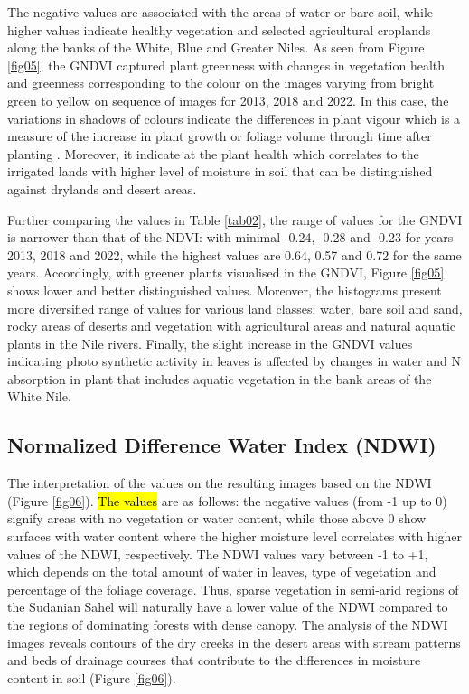 \documentclass[jimaging,article,submit,pdftex,moreauthors]{Definitions/mdpi}
\begin{document}
The negative values are associated with the areas of water or bare soil, while higher values indicate healthy vegetation and selected agricultural croplands along the banks of the White, Blue and Greater Niles. As seen from Figure \ref{fig05}, the GNDVI captured plant greenness with changes in vegetation health and greenness corresponding to the colour on the images varying from bright green to yellow on sequence of images for 2013, 2018 and 2022. In this case, the variations in shadows of colours indicate the differences in plant vigour which is a measure of the increase in plant growth or foliage volume through time after planting \cite{Dictionary}. Moreover, it indicate at the plant health which correlates to the irrigated lands with higher level of moisture in soil that can be distinguished against drylands and desert areas. 

Further comparing the values in Table \ref{tab02}, the range of values for the GNDVI is narrower than that of the NDVI: with minimal -0.24, -0.28 and -0.23 for years 2013, 2018 and 2022, while the highest values are 0.64, 0.57 and 0.72 for the same years. Accordingly, with greener plants visualised in the GNDVI, Figure \ref{fig05} shows lower and better distinguished values. Moreover, the histograms present more diversified range of values for various land classes: water, bare soil and sand, rocky areas of deserts and vegetation with agricultural areas and natural aquatic plants in the Nile rivers. Finally, the slight increase in the GNDVI values indicating photo synthetic activity in leaves is affected by changes in water and N absorption in plant that includes aquatic vegetation in the bank areas of the White Nile. 

\subsection{Normalized Difference Water Index (NDWI)}

The interpretation of the values on the resulting images based on the NDWI (Figure \ref{fig06}). \hl{The values} are as follows: the negative values (from -1 up to 0) signify areas with no vegetation or water content, while those above 0 show surfaces with water content where the higher moisture level correlates with higher values of the NDWI, respectively. The NDWI values vary between -1 to +1, which depends on the total amount of water in leaves, type of vegetation and percentage of the foliage coverage. Thus, sparse vegetation in semi-arid regions of the Sudanian Sahel will naturally have a lower value of the NDWI compared to the regions of dominating forests with dense canopy. The analysis of the NDWI images reveals contours of the dry creeks in the desert areas with stream patterns and beds of drainage courses that contribute to the differences in moisture content in soil (Figure \ref{fig06}). 
\end{document}
